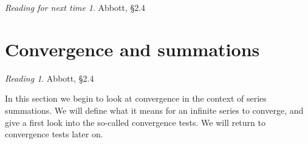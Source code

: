 \documentclass[11pt,oneside]{amsbook}
\theoremstyle{definition}
\newtheorem{exerc}{Exercise}[section]
\theoremstyle{plain}
\theoremstyle{definition}
\theoremstyle{remark}
\newtheorem*{reading}{Reading}
\newtheorem*{readnext}{Reading for next time}
\numberwithin{equation}{section}
\numberwithin{figure}{section}
\begin{document}

%
%
%
%

\begin{readnext}
  Abbott, \S 2.4
\end{readnext}


\newpage
\section{Convergence and summations}

\begin{reading}
  Abbott, \S 2.4
\end{reading}

In this section we begin to look at convergence in the context of series summations. We will define what it means for an infinite series to converge, and give a first look into the so-called convergence tests. We will return to convergence tests later on.
\end{document}
